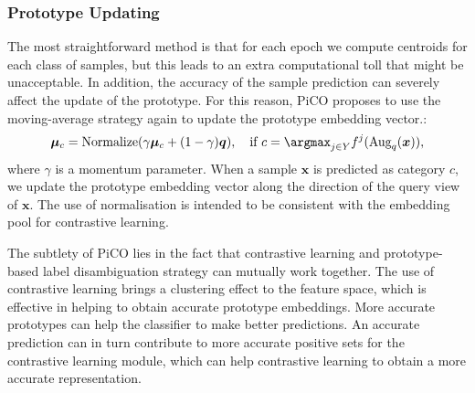 \documentclass{article} %
\begin{document}
\subsubsection*{\textbf{Prototype Updating}}
The most straightforward method is that for each epoch we compute centroids for each class of samples, but this leads to an extra computational toll that might be unacceptable. In addition, the accuracy of the sample prediction can severely affect the update of the prototype. For this reason, PiCO proposes to use the moving-average strategy again to update the prototype embedding vector.:
\begin{equation}
    \boldsymbol{\mu}_c = \text{Normalize}(\gamma \boldsymbol{\mu}_c + (1-\gamma)\boldsymbol{q}), ~~~ \text{if } c = \argmax_{j\in Y} f^j(\text{Aug}_q(\boldsymbol{x})),
\end{equation}
where $\gamma$ is a momentum parameter. 
When a sample $\boldsymbol{x}$ is predicted as category $c$, we update the prototype embedding vector along the direction of the query view of $\boldsymbol{x}$. The use of normalisation is intended to be consistent with the embedding pool for contrastive learning. 

The subtlety of PiCO lies in the fact that contrastive learning and prototype-based label disambiguation strategy can mutually work together. The use of contrastive learning brings a clustering effect to the feature space, which is effective in helping to obtain accurate prototype embeddings. More accurate prototypes can help the classifier to make better predictions. An accurate prediction can in turn contribute to more accurate positive sets for the contrastive learning module, which can help contrastive learning to obtain a more accurate representation. 
\end{document}
